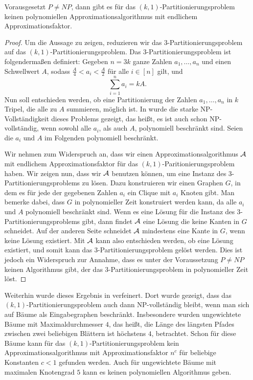 \begin{thm}\label{thm:np_comp}
    Vorausgesetzt $P \neq NP$, dann gibt es für das $(k,1)$-Partitionierungsproblem keinen polynomiellen Approximationsalgorithmus mit endlichem Approximationsfaktor.
\end{thm}
\begin{proof}
    Um die Aussage zu zeigen, reduzieren wir das $3$-Partitionierungsproblem auf das $(k,1)$-Partitionierungsproblem. 
    Das $3$-Partitionierungsproblem ist folgendermaßen definiert: Gegeben $n = 3k$ ganze Zahlen $a_1,\ldots, a_n$ und einen Schwellwert $A$, sodass $\frac{A}{4} < a_i < \frac{A}{2}$ für alle $i \in [n]$ gilt, und 
    \begin{equation*}
        \sum_{i=1}^{n} a_i = kA.
    \end{equation*}
    Nun soll entschieden werden, ob eine Partitionierung der Zahlen $a_1, \ldots, a_n$ in $k$ Tripel, die alle zu $A$ summieren, möglich ist. 
    In \parencite{gj79} wurde die starke NP-Vollständigkeit dieses Problems gezeigt, das heißt, es ist auch schon NP-vollständig, wenn sowohl alle $a_i$, als auch $A$, polynomiell beschränkt sind.
    Seien die $a_i$ und $A$ im Folgenden polynomiell beschränkt.

    \noindent Wir nehmen zum Widerspruch an, dass wir einen Approximationsalgorithmus $\mathcal{A}$ mit endlichem Approximationsfaktor für das $(k,1)$-Paritionierungsproblem haben. 
    Wir zeigen nun, dass wir $\mathcal{A}$ benutzen können, um eine Instanz des $3$-Partitionierungsproblems zu lösen.
    Dazu konstruieren wir einen Graphen $G$, in dem es für jede der gegebenen Zahlen $a_i$ ein Clique mit $a_i$ Knoten gibt.
	Man bemerke dabei, dass $G$ in polynomieller Zeit konstruiert werden kann, da alle $a_i$ und $A$ polynomiell beschränkt sind.
    Wenn es eine Lösung für die Instanz des $3$-Partitionierungsproblems gibt, dann findet $\mathcal{A}$ eine Lösung die keine Kanten in $G$ schneidet. 
    Auf der anderen Seite schneidet $\mathcal{A}$ mindestens eine Kante in $G$, wenn keine Lösung existiert.
    Mit $\mathcal{A}$ kann also entschieden werden, ob eine Lösung existiert, und somit kann das $3$-Partitionierungsproblem gelöst werden.
    Dies ist jedoch ein Widerspruch zur Annahme, dass es unter der Voraussetzung $P \neq NP$ keinen Algorithmus gibt, der das $3$-Partitionierungsproblem in polynomieller Zeit löst.
\end{proof}

Weiterhin wurde dieses Ergebnis in \parencite{ff13} verfeinert. 
Dort wurde gezeigt, dass das $(k,1)$-Partitionierungsproblem auch dann NP-vollständig bleibt, wenn man sich auf Bäume als Eingabegraphen beschränkt.
Insbesondere wurden ungewichtete Bäume mit Maximaldurchmesser $4$, das heißt, die Länge des längsten Pfades zwischen zwei beliebigen Blättern ist höchstens $4$, betrachtet.
Schon für diese Bäume kann für das $(k,1)$-Partitionierungsproblem kein Approximationsalgorithmus mit Approximationsfaktor $n^c$ für beliebige Konstanten $c < 1$ gefunden werden.
Auch für ungewichtete Bäume mit maximalen Knotengrad $5$ kann es keinen polynomiellen Algorithmus geben.

